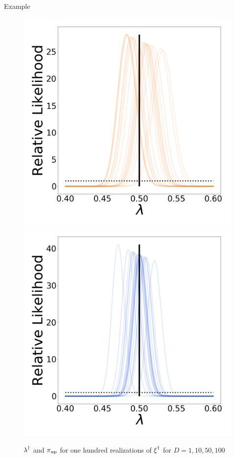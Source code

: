 \begin{block}{Example}
\begin{figure}
        \includegraphics[width=13cm]{figures/updated_stability_D50_sigma-10E-4}
        \includegraphics[width=13cm]{figures/updated_stability_D100_sigma-10E-4}
        \vspace{-1cm}
        \caption{$\operatorname*{\lambda}^\dagger$ and $\operatorname*{\pi_{up}}$ for one hundred realizations of $\operatorname*{\xi}^\dagger$ for $D=1, 10, 50, 100$}
    \end{figure}

\end{block}
